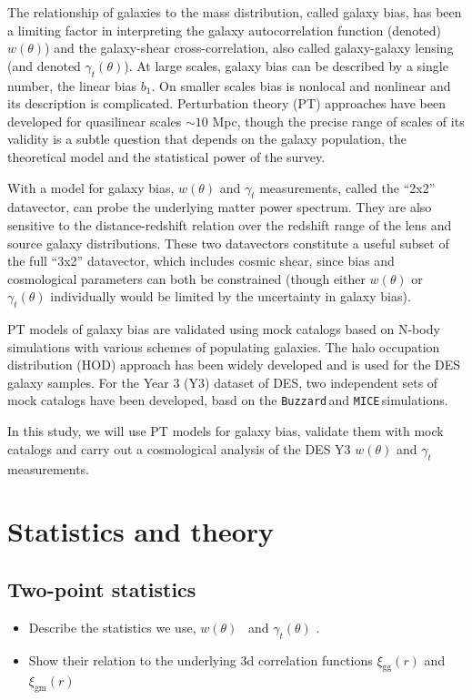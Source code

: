 \documentclass[fleqn,usenatbib]{mnras}
\newcommand{\gammat}{\ensuremath{\gamma_{t}(\theta)} }
\newcommand{\wtheta}{\ensuremath{w(\theta)} }
\newcommand{\xigg}{\ensuremath{\xi_{\mathrm{gg}}}}
\newcommand{\xigm}{\ensuremath{\xi_{\mathrm{gm}}}}
\newcommand{\mice}{\texttt{MICE}\,}
\newcommand{\buzzard}{\texttt{Buzzard}\,}
\begin{document}
The relationship of galaxies to the mass distribution, called galaxy bias, has been a limiting factor in interpreting the galaxy autocorrelation function (denoted) $w(\theta)$) and the galaxy-shear cross-correlation, also called galaxy-galaxy lensing (and denoted $\gamma_t(\theta)$). At large scales, galaxy bias can be described by a single number, the linear bias $b_1$. On smaller scales bias is nonlocal and nonlinear and its description is complicated. Perturbation theory (PT) approaches have been developed for quasilinear scales $\sim 10$ Mpc, though the precise range of scales of its validity is a subtle question that depends on the galaxy population, the theoretical model and the statistical power of the survey. 

With a model for galaxy bias, $w(\theta)$ and $\gamma_t$ measurements, called the ``2x2'' datavector,   can probe the underlying matter power spectrum. They are also sensitive to the distance-redshift relation over the redshift range of the lens and source galaxy distributions.  These two datavectors constitute a useful subset of the full ``3x2'' datavector, which includes cosmic shear, since bias and cosmological parameters can both be constrained (though either $w(\theta)$ or $\gamma_t(\theta)$ individually would be limited by the uncertainty in galaxy bias). 

PT models of galaxy bias are validated using mock catalogs based on N-body simulations with various schemes of populating galaxies. The halo occupation distribution (HOD) approach has been widely developed and is used for the DES galaxy samples. For the Year 3 (Y3) dataset of DES, two independent sets of mock catalogs have been developed, basd on the \buzzard and \mice simulations. 

In this study, we will use PT models for galaxy bias, validate them with mock catalogs and carry out a cosmological analysis of the DES Y3 $w(\theta)$ and $\gamma_t$ measurements.




\section{Statistics and theory}
\label{sec:stat_theory}
\subsection{Two-point statistics}
\label{sec:2pt}
\begin{itemize}
    \item Describe the statistics we use, \wtheta\ and \gammat.
    \item Show their relation to the underlying 3d correlation functions $\xigg(r)$ and $\xigm(r)$
\end{itemize}
\end{document}

